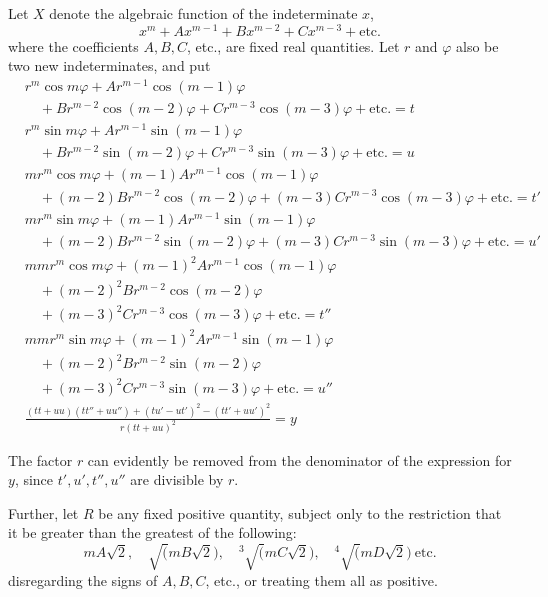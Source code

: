 Let $X$ denote the algebraic function of the indeterminate $x$,
\[
x^m+Ax^{m-1}+Bx^{m-2}+Cx^{m-3}+\mathrm{etc.}
\]
where the coefficients $A,B,C$, etc., are fixed real quantities. Let $r$ and $\varphi$ also be two new indeterminates, and put
\[
\begin{aligned}
&r^m\cos m\varphi+Ar^{m-1}\cos(m-1)\varphi
\\
&\quad+Br^{m-2}\cos(m-2)\varphi+Cr^{m-3}\cos(m-3)\varphi
+\mathrm{etc.}=t\\
&r^m\sin m\varphi+Ar^{m-1}\sin(m-1)\varphi
\\
&\quad+Br^{m-2}\sin(m-2)\varphi+Cr^{m-3}\sin(m-3)\varphi
+\mathrm{etc.}=u\\
&mr^m\cos m\varphi+(m-1)Ar^{m-1}\cos(m-1)\varphi
\\
&\quad+(m-2)Br^{m-2}\cos(m-2)\varphi+(m-3)Cr^{m-3}\cos(m-3)\varphi
+\mathrm{etc.}=t'\\
&mr^m\sin m\varphi+(m-1)Ar^{m-1}\sin(m-1)\varphi
\\
&\quad+(m-2)Br^{m-2}\sin(m-2)\varphi+(m-3)Cr^{m-3}\sin(m-3)\varphi
+\mathrm{etc.}=u'\\
&mmr^m\cos m\varphi+(m-1)^2Ar^{m-1}\cos(m-1)\varphi
\\
&\quad+(m-2)^2Br^{m-2}\cos(m-2)\varphi\\
&\quad+(m-3)^2Cr^{m-3}\cos(m-3)\varphi
+\mathrm{etc.}=t''\\
&mmr^m\sin m\varphi+(m-1)^2Ar^{m-1}\sin(m-1)\varphi
\\
&\quad+(m-2)^2Br^{m-2}\sin(m-2)\varphi\\
&\quad+(m-3)^2Cr^{m-3}\sin(m-3)\varphi
+\mathrm{etc.}=u''\\
&\frac{(tt+uu)(tt''+uu'')+(tu'-ut')^2-(tt'+uu')^2}
{r(tt+uu)^2}=y
\end{aligned}
\]

The factor $r$ can evidently be removed from the denominator of the expression for $y$, since $t',u',t'',u''$ are divisible by $r$.

Further, let $R$ be any fixed positive quantity, subject only to the restriction that it be greater than the greatest of the following:
\[
mA\surd2,\quad\surd(mB\surd2),\quad
{}^3\!\surd(mC\surd2),\quad{}^4\!\surd(mD\surd2)\ \mathrm{etc.}
\]
disregarding the signs of $A,B,C$, etc., or treating them all as positive.

